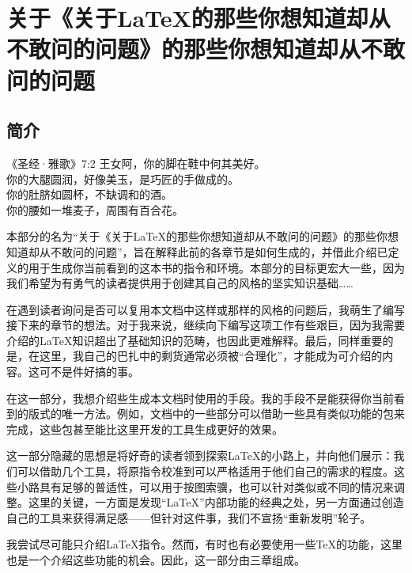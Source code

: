 \part{关于《关于\LaTeX 的那些你想知道却从不敢问的问题》的那些你想知道却从不敢问的问题}

\fancyhead[LE]{\bfseries\thepage}
\fancyhead[RO]{\bfseries\thepage}

\chapter*{简介}

\begin{epigraphe}{《圣经·雅歌》7:2}
    王女阿，你的脚在鞋中何其美好。\\你的大腿圆润，好像美玉，是巧匠的手做成的。\\你的肚脐如圆杯，不缺调和的酒。\\你的腰如一堆麦子，周围有百合花。
\end{epigraphe}

本部分的名为“关于《关于\LaTeX 的那些你想知道却从不敢问的问题》的那些你想知道却从不敢问的问题”，旨在解释此前的各章节是如何生成的，并借此介绍已定义的用于生成你当前看到的这本书的指令和环境。本部分的目标更宏大一些，因为我们希望为有勇气的读者提供用于创建其自己的风格的坚实知识基础……

在遇到读者询问是否可以复用本文档中这样或那样的风格的问题后，我萌生了编写接下来的章节的想法。对于我来说，继续向下编写这项工作有些艰巨，因为我需要介绍的\LaTeX 知识超出了基础知识的范畴，也因此更难解释。最后，同样重要的是，在这里，我自己的巴扎中的剩货通常必须被“合理化”，才能成为可介绍的内容。这可不是件好搞的事。

在这一部分，我想介绍些生成本文档时使用的手段。我的手段不是能获得你当前看到的版式的唯一方法。例如，文档中的一些部分可以借助一些具有类似功能的包来完成，这些包甚至能比这里开发的工具生成更好的效果。

这一部分隐藏的思想是将好奇的读者领到探索\LaTeX 的小路上，并向他们展示：我们可以借助几个工具，将原指令校准到可以严格适用于他们自己的需求的程度。这些小路具有足够的普适性，可以用于按图索骥，也可以针对类似或不同的情况来调整。这里的关键，一方面是发现“\LaTeX ”内部功能的经典之处，另一方面通过创造自己的工具来获得满足感——但针对这件事，我们不宣扬“重新发明”轮子。

我尝试尽可能只介绍\LaTeX 指令。然而，有时也有必要使用一些\TeX 的功能，这里也是一个介绍这些功能的机会。因此，这一部分由三章组成。

